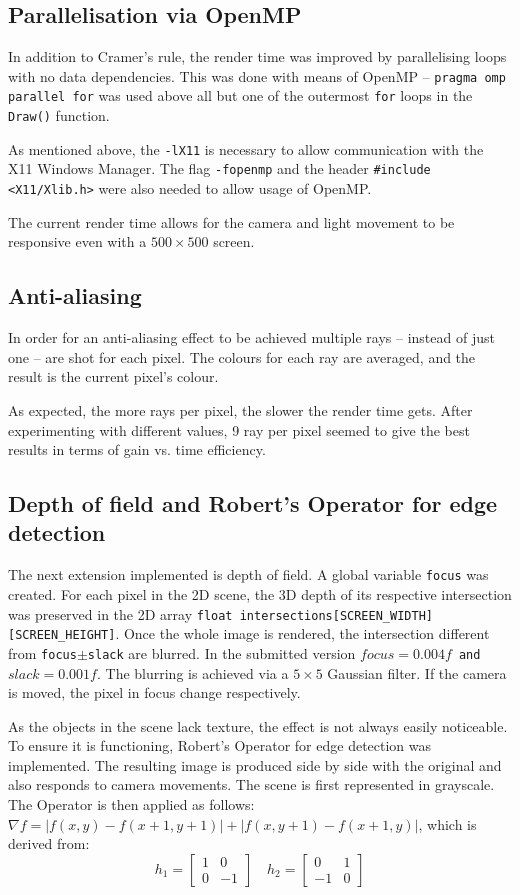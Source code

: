 \documentclass[DIV=calc, paper=a4, fontsize=11pt, twocolumn]{article}	 %
\begin{document}
	\subsection*{Parallelisation via OpenMP}
	In addition to Cramer's rule, the render time was improved by parallelising loops with no data dependencies. This was done with means of OpenMP -- \texttt{pragma omp parallel for} was used above all but one of the outermost \texttt{for} loops in the \texttt{Draw()} function.
	\par
	As mentioned above, the \texttt{-lX11} is necessary to allow communication with the X11 Windows Manager. The flag \texttt{-fopenmp} and the header \texttt{\#include <X11/Xlib.h>} were also needed to allow usage of OpenMP.
	\par
	The current render time allows for the camera and light movement to be responsive even with a $500\times500$ screen.
	
	\subsection*{Anti-aliasing}
	In order for an anti-aliasing effect to be achieved multiple rays -- instead of just one -- are shot for each pixel. The colours for each ray are averaged, and the result is the current pixel's colour.
	\par
	As expected, the more rays per pixel, the slower the render time gets. After experimenting with different values, 9 ray per pixel seemed to give the best results in terms of gain vs. time efficiency.
	\subsection*{Depth of field and Robert's Operator for edge detection}
	The next extension implemented is depth of field. A global variable \texttt{focus} was created. For each pixel in the 2D scene, the 3D depth of its respective intersection was preserved in the 2D array \texttt{float intersections[SCREEN\_WIDTH][SCREEN\_HEIGHT]}. Once the whole image is rendered, the intersection different from \texttt{focus$\pm$slack} are blurred. In the submitted version \texttt{$focus = 0.004f$ and $slack = 0.001f$}. The blurring is achieved via a $5\times 5$ Gaussian filter. If the camera is moved, the pixel in focus change respectively.
	\par
	As the objects in the scene lack texture, the effect is not always easily noticeable. To ensure it is functioning, Robert's Operator for edge detection was implemented. The resulting image is produced side by side with the original and also responds to camera movements. The scene is first represented in grayscale. The Operator is then applied as follows: $\nabla f = |f(x,y) - f(x+1,y+1)| + |f(x,y+1) - f(x+1,y)| $, which is derived from:
	\[
		h_{1} = 
		\begin{bmatrix} 
		1 & 0 \\
		0 & -1 
		\end{bmatrix}
		\quad
		h_{2} = 
		\begin{bmatrix} 
		0 & 1 \\
		-1 & 0 
		\end{bmatrix}
	\]
	
\end{document}
